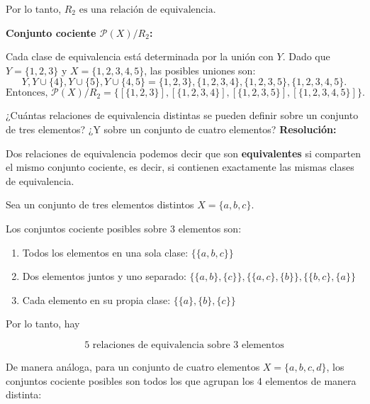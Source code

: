 \documentclass[a4paper,12pt]{article}
\begin{document}
\begin{ejercicio}[title=Ejercicio 14]
Por lo tanto, \(\boxed{R_2 \text{ es una relación de equivalencia.}}\)

\vspace{0.5em}

\textbf{Conjunto cociente $\mathcal{P}(X)/R_2$:}  

Cada clase de equivalencia está determinada por la unión con $Y$. Dado que $Y = \{1,2,3\}$ y $X = \{1,2,3,4,5\}$, las posibles uniones son:
\[
Y, Y\cup \{4\}, Y\cup \{5\}, Y\cup \{4,5\} = \{1,2,3\}, \{1,2,3,4\}, \{1,2,3,5\}, \{1,2,3,4,5\}.
\]
\[
\text{Entonces, }\boxed{\mathcal{P}(X)/R_2 = \{ [\{1,2,3\}], [\{1,2,3,4\}], [\{1,2,3,5\}], [\{1,2,3,4,5\}] \}}.
\]

\end{ejercicio}

\begin{ejercicio}[title=Ejercicio 15]
¿Cuántas relaciones de equivalencia distintas se pueden definir sobre un conjunto de tres elementos?
¿Y sobre un conjunto de cuatro elementos?
\tcblower
\textbf{Resolución:}

Dos relaciones de equivalencia podemos decir que son \textbf{equivalentes} si comparten el mismo conjunto cociente, es decir, si contienen exactamente las mismas clases de equivalencia.

Sea un conjunto de tres elementos distintos \(X = \{a,b,c\}\).  

Los conjuntos cociente posibles sobre 3 elementos son:

\begin{enumerate}
\item Todos los elementos en una sola clase: \(\{ \{a,b,c\} \}\)
\item Dos elementos juntos y uno separado: 
\(\{ \{a,b\}, \{c\} \}, \{ \{a,c\}, \{b\} \}, \{ \{b,c\}, \{a\} \}\)
\item Cada elemento en su propia clase: \(\{ \{a\}, \{b\}, \{c\} \}\)
\end{enumerate}

Por lo tanto, hay

\[
\boxed{5 \text{ relaciones de equivalencia sobre 3 elementos}}
\]

De manera análoga, para un conjunto de cuatro elementos \(X = \{a,b,c,d\}\), los conjuntos cociente posibles son todos los que agrupan los 4 elementos de manera distinta:


\end{ejercicio}
\end{document}
